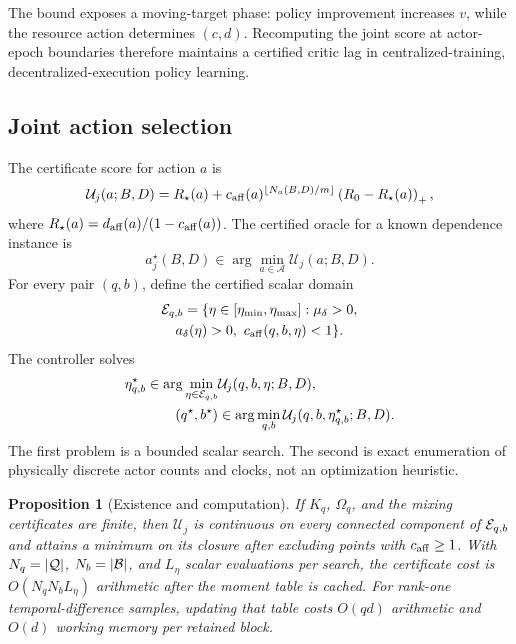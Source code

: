 \documentclass[journal]{IEEEtran}
\newtheorem{proposition}{Proposition}
\newcommand{\A}{\mathcal{A}}
\begin{document}
The bound exposes a moving-target phase: policy improvement increases $v$, while the resource action determines $(c,d)$.
Recomputing the joint score at actor-epoch boundaries therefore maintains a certified critic lag in centralized-training, decentralized-execution policy learning.

\subsection{Joint action selection}
The certificate score for action $a$ is
\begin{equation}
\mathcal{U}_j(a;B,D)=R_\star(a)+c_{\rm aff}(a)^{\lfloor N_a(B,D)/m\rfloor}\left(R_0-R_\star(a)\right)_+,
\label{eq:certificate-score}
\end{equation}
where $R_\star(a)=d_{\rm aff}(a)/(1-c_{\rm aff}(a))$.
The certified oracle for a known dependence instance is
\begin{equation}
a_j^\star(B,D)\in\arg\min_{a\in\A}\mathcal{U}_j(a;B,D).
\label{eq:catalogue-oracle}
\end{equation}
For every pair $(q,b)$, define the certified scalar domain
\begin{multline}
{\cal E}_{q,b}=\{\eta\in[\eta_{\min},\eta_{\max}]:
\mu_\delta>0,\\
a_\delta(\eta)>0,\ c_{\rm aff}(q,b,\eta)<1\}.
\label{eq:certified-step-domain}
\end{multline}
The controller solves
\begin{align}
\eta_{q,b}^\star\in\arg\min_{\eta\in{\cal E}_{q,b}}
&\mathcal U_j(q,b,\eta;B,D),\nonumber\\
(q^\star,b^\star)&\in\arg\min_{q,b}
\mathcal U_j(q,b,\eta_{q,b}^\star;B,D).
\label{eq:mixed-controller}
\end{align}
The first problem is a bounded scalar search.
The second is exact enumeration of physically discrete actor counts and clocks, not an optimization heuristic.

\begin{proposition}[Existence and computation]
If $K_q$, $\Omega_q$, and the mixing certificates are finite, then $\mathcal U_j$ is continuous on every connected component of ${\cal E}_{q,b}$ and attains a minimum on its closure after excluding points with $c_{\rm aff}\ge1$.
With $N_q=|{\cal Q}|$, $N_b=|{\cal B}|$, and $L_\eta$ scalar evaluations per search, the certificate cost is $O(N_qN_bL_\eta)$ arithmetic after the moment table is cached.
For rank-one temporal-difference samples, updating that table costs $O(qd)$ arithmetic and $O(d)$ working memory per retained block.
\label{prop:computation}
\end{proposition}
\end{document}
